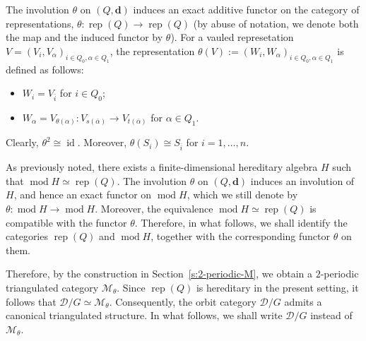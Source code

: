 \documentclass[12pt,reqno]{amsart}
\numberwithin{equation}{section}
\renewcommand{\mod}{\operatorname{mod}\nolimits}
\newcommand{\rep}{\operatorname{rep}\nolimits}
\newcommand{\id}{\operatorname{id}\nolimits}
\newtheorem{remark}[theorem]{Remark}
\begin{document}
	The involution $\theta$ on $(Q, \mathbf{d})$ induces an exact additive functor on the category of representations, $\theta: \rep(Q) \rightarrow \rep(Q)$ (by abuse of notation, we denote both the map and the induced functor by $\theta$). For a vauled represetation $V=(V_i,V_\alpha)_{i\in Q_0,\alpha\in Q_1}$, the representation $\theta(V):=(W_i,W_\alpha)_{i\in Q_0,\alpha\in Q_1}$ is defined as follows:
	\begin{itemize}
		\item $W_i=V_{\bar{i}}$ for $i\in Q_0$;
		\item $W_\alpha=V_{\theta(\alpha)}:V_{s(\bar{\alpha})}\rightarrow V_{t(\bar{\alpha})}$ for $\alpha\in Q_1$.
	\end{itemize}
	Clearly, $\theta^2\cong \id$. Moreover,  
	$\theta(S_i)\cong S_{\bar{i}}$ for $i=1,\dots,n$.
	
	As previously noted, there exists a finite-dimensional hereditary algebra $H$
	such that
	$\mod H\simeq \rep(Q).$
	The involution $\theta$ on $(Q,\mathbf d)$ induces an involution of $H$,
	and hence an exact functor on $\mod H$, which we still denote by
	$\theta:\mod H\rightarrow \mod H.$
	Moreover, the equivalence
	$\mod H\simeq \rep(Q)$
	is compatible with the functor $\theta$. Therefore, in what follows, we shall
	identify the categories $\rep(Q)$ and $\mod H$, together with the
	corresponding functor $\theta$ on them.
	
	Therefore, by the construction in Section~\ref{s:2-periodic-M}, we obtain a
	$2$-periodic triangulated category $\mathcal{M}_\theta$. Since
	$\rep(Q)$ is hereditary in the present setting, it follows that
	$\mathcal{D}/G \simeq \mathcal{M}_\theta.$
	Consequently, the orbit category $\mathcal{D}/G$ admits a canonical
	triangulated structure. In what follows, we shall write $\mathcal{D}/G$
	instead of $\mathcal{M}_\theta$.
	
	
	
	
	
\end{document}
